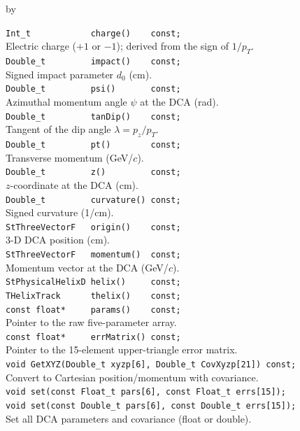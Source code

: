 \documentclass[twoside]{article}
\newcommand{\entrylabel}[1]{\mbox{\textbf{{#1}}}\hfil}%
\newenvironment{entry}
{\begin{list}{}%
    {\renewcommand{\makelabel}{\entrylabel}%
     \setlength{\labelwidth}{90pt}%
     \setlength{\leftmargin}{\labelwidth}
     \advance\leftmargin by \labelsep%
      }%
    }%
  {\end{list}}
\newcommand{\Entrylabel}[1]%
{\raisebox{0pt}[1ex][0pt]{\makebox[\labelwidth][l]%
    {\parbox[t]{\labelwidth}{\hspace{0pt}\textbf{{#1}}}}}}
\newenvironment{Entry}%
{\renewcommand{\entrylabel}{\Entrylabel}\begin{entry}}%
  {\end{entry}}
\begin{document}
\begin{Entry}
\item[Public Member\\ Functions]
    \verb+Int_t            charge()    const;+\\
        Electric charge ($+1$ or $-1$); derived from the sign of $1/p_T$.\\
    \verb+Double_t         impact()    const;+\\
        Signed impact parameter $d_0$ (cm).\\
    \verb+Double_t         psi()       const;+\\
        Azimuthal momentum angle $\psi$ at the DCA (rad).\\
    \verb+Double_t         tanDip()    const;+\\
        Tangent of the dip angle $\lambda = p_z/p_T$.\\
    \verb+Double_t         pt()        const;+\\
        Transverse momentum (GeV/$c$).\\
    \verb+Double_t         z()         const;+\\
        $z$-coordinate at the DCA (cm).\\
    \verb+Double_t         curvature() const;+\\
        Signed curvature (1/cm).\\
    \verb+StThreeVectorF   origin()    const;+\\
        3-D DCA position (cm).\\
    \verb+StThreeVectorF   momentum()  const;+\\
        Momentum vector at the DCA (GeV/$c$).\\
    \verb+StPhysicalHelixD helix()     const;+\\
    \verb+THelixTrack      thelix()    const;+\\
    \verb+const float*     params()    const;+\\
        Pointer to the raw five-parameter array.\\
    \verb+const float*     errMatrix() const;+\\
        Pointer to the 15-element upper-triangle error matrix.\\
    \verb+void GetXYZ(Double_t xyzp[6], Double_t CovXyzp[21]) const;+\\
        Convert to Cartesian position/momentum with covariance.\\
    \verb+void set(const Float_t pars[6], const Float_t errs[15]);+\\
    \verb+void set(const Double_t pars[6], const Double_t errs[15]);+\\
        Set all DCA parameters and covariance (float or double).\\
\end{Entry}
\clearpage
\end{document}
